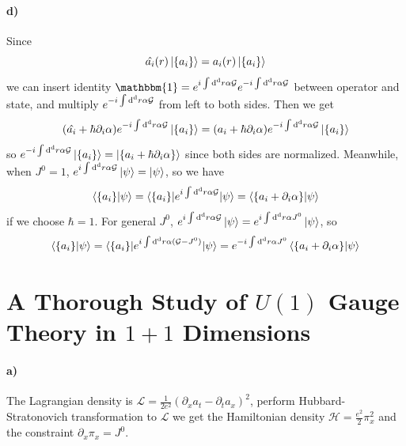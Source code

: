 \documentclass[a4paper,11pt]{article}
\begin{document}
\paragraph{d)}
Since 
\begin{equation}
    \hat{a_i}(r)\ket{\{a_i\}} = a_i(r)\ket{\{a_i\}}
\end{equation}
we can insert identity $ \mathbbm{1} = e^{i \int {\rm d}^{\rm d}r \alpha \mathcal{G}}  e^{-i \int {\rm d}^{\rm d}r \alpha \mathcal{G}}$ between operator and state, and multiply $e^{-i \int {\rm d}^{\rm d}r \alpha \mathcal{G}}$ from left to both sides. Then we get 
\begin{equation}
    (\hat{a_i} + \hbar \partial_i \alpha ) e^{-i \int {\rm d}^{\rm d}r \alpha \mathcal{G}}\ket{\{a_i\}}
    = (a_i + \hbar \partial_i \alpha )     e^{-i \int {\rm d}^{\rm d}r \alpha \mathcal{G}}\ket{\{a_i\}}
\end{equation}
so $ e^{-i \int {\rm d}^{\rm d}r \alpha \mathcal{G}}\ket{\{a_i\}} = \ket{\{a_i + \hbar \partial_i \alpha\}}$ since both sides are normalized. Meanwhile, when $J^0 = 1$, $e^{i \int {\rm d}^{\rm d}r \alpha \mathcal{G}}\ket{\psi} = \ket{\psi}$, so we have
\begin{equation}
    \braket{\{a_i\} | \psi} 
    = \braket{\{a_i\} |e^{i \int {\rm d}^{\rm d}r \alpha \mathcal{G}}| \psi} 
    = \braket{\{a_i + \partial_i \alpha\} | \psi} 
\end{equation}
if we choose $\hbar = 1$.
For general $J^0$, $e^{i \int {\rm d}^{\rm d}r \alpha \mathcal{G}}\ket{\psi} = e^{i \int {\rm d}^{\rm d}r \alpha J^0}\ket{\psi}$, so
\begin{equation}
    \braket{\{a_i\} | \psi} 
    = \braket{\{a_i\} |e^{i \int {\rm d}^{\rm d}r \alpha (\mathcal{G} - J^0)}| \psi} 
    = e^{-i \int {\rm d}^{\rm d}r \alpha J^0}\braket{\{a_i + \partial_i \alpha\} | \psi} 
\end{equation}

\section{A Thorough Study of $U(1)$ Gauge Theory in $1+1$ Dimensions}
\paragraph{a)}
The Lagrangian density is $ \mathcal{L} = \frac{1}{2e^2} (\partial_x a_t - \partial_t a_x)^2$, perform Hubbard-Stratonovich transformation to $\mathcal{L}$ we get the Hamiltonian density $\mathcal{H} = \frac{e^2}{2} \pi^2_x$ and the constraint $\partial_x \pi_x = J^0$.
\end{document}
